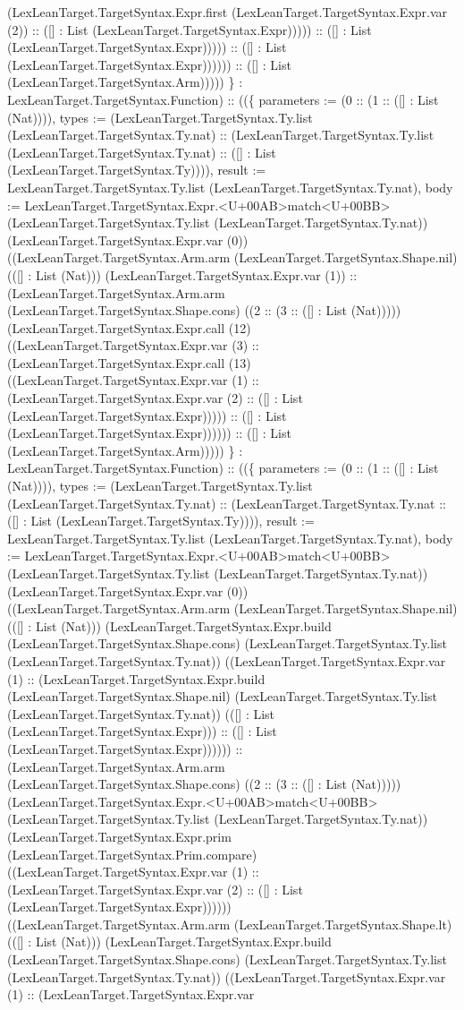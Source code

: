 \documentclass[11pt]{article}
\begin{document}
(LexLeanTarget.TargetSyntax.Expr.first (LexLeanTarget.TargetSyntax.Expr.var (2)) :: ([] : List (LexLeanTarget.TargetSyntax.Expr))))) :: ([] : List (LexLeanTarget.TargetSyntax.Expr))))) :: ([] : List (LexLeanTarget.TargetSyntax.Expr)))))) :: ([] : List (LexLeanTarget.TargetSyntax.Arm))))) \} : LexLeanTarget.TargetSyntax.Function) :: ((\{ parameters := (0 :: (1 :: ([] : List (Nat)))), types := (LexLeanTarget.TargetSyntax.Ty.list (LexLeanTarget.TargetSyntax.Ty.nat) :: (LexLeanTarget.TargetSyntax.Ty.list (LexLeanTarget.TargetSyntax.Ty.nat) :: ([] : List (LexLeanTarget.TargetSyntax.Ty)))), result := LexLeanTarget.TargetSyntax.Ty.list (LexLeanTarget.TargetSyntax.Ty.nat), body := LexLeanTarget.TargetSyntax.Expr.<U+00AB>match<U+00BB> (LexLeanTarget.TargetSyntax.Ty.list (LexLeanTarget.TargetSyntax.Ty.nat)) (LexLeanTarget.TargetSyntax.Expr.var (0)) ((LexLeanTarget.TargetSyntax.Arm.arm (LexLeanTarget.TargetSyntax.Shape.nil) (([] : List (Nat))) (LexLeanTarget.TargetSyntax.Expr.var (1)) :: (LexLeanTarget.TargetSyntax.Arm.arm (LexLeanTarget.TargetSyntax.Shape.cons) ((2 :: (3 :: ([] : List (Nat))))) (LexLeanTarget.TargetSyntax.Expr.call (12) ((LexLeanTarget.TargetSyntax.Expr.var (3) :: (LexLeanTarget.TargetSyntax.Expr.call (13) ((LexLeanTarget.TargetSyntax.Expr.var (1) :: (LexLeanTarget.TargetSyntax.Expr.var (2) :: ([] : List (LexLeanTarget.TargetSyntax.Expr))))) :: ([] : List (LexLeanTarget.TargetSyntax.Expr)))))) :: ([] : List (LexLeanTarget.TargetSyntax.Arm))))) \} : LexLeanTarget.TargetSyntax.Function) :: ((\{ parameters := (0 :: (1 :: ([] : List (Nat)))), types := (LexLeanTarget.TargetSyntax.Ty.list (LexLeanTarget.TargetSyntax.Ty.nat) :: (LexLeanTarget.TargetSyntax.Ty.nat :: ([] : List (LexLeanTarget.TargetSyntax.Ty)))), result := LexLeanTarget.TargetSyntax.Ty.list (LexLeanTarget.TargetSyntax.Ty.nat), body := LexLeanTarget.TargetSyntax.Expr.<U+00AB>match<U+00BB> (LexLeanTarget.TargetSyntax.Ty.list (LexLeanTarget.TargetSyntax.Ty.nat)) (LexLeanTarget.TargetSyntax.Expr.var (0)) ((LexLeanTarget.TargetSyntax.Arm.arm (LexLeanTarget.TargetSyntax.Shape.nil) (([] : List (Nat))) (LexLeanTarget.TargetSyntax.Expr.build (LexLeanTarget.TargetSyntax.Shape.cons) (LexLeanTarget.TargetSyntax.Ty.list (LexLeanTarget.TargetSyntax.Ty.nat)) ((LexLeanTarget.TargetSyntax.Expr.var (1) :: (LexLeanTarget.TargetSyntax.Expr.build (LexLeanTarget.TargetSyntax.Shape.nil) (LexLeanTarget.TargetSyntax.Ty.list (LexLeanTarget.TargetSyntax.Ty.nat)) (([] : List (LexLeanTarget.TargetSyntax.Expr))) :: ([] : List (LexLeanTarget.TargetSyntax.Expr)))))) :: (LexLeanTarget.TargetSyntax.Arm.arm (LexLeanTarget.TargetSyntax.Shape.cons) ((2 :: (3 :: ([] : List (Nat))))) (LexLeanTarget.TargetSyntax.Expr.<U+00AB>match<U+00BB> (LexLeanTarget.TargetSyntax.Ty.list (LexLeanTarget.TargetSyntax.Ty.nat)) (LexLeanTarget.TargetSyntax.Expr.prim (LexLeanTarget.TargetSyntax.Prim.compare) ((LexLeanTarget.TargetSyntax.Expr.var (1) :: (LexLeanTarget.TargetSyntax.Expr.var (2) :: ([] : List (LexLeanTarget.TargetSyntax.Expr)))))) ((LexLeanTarget.TargetSyntax.Arm.arm (LexLeanTarget.TargetSyntax.Shape.lt) (([] : List (Nat))) (LexLeanTarget.TargetSyntax.Expr.build (LexLeanTarget.TargetSyntax.Shape.cons) (LexLeanTarget.TargetSyntax.Ty.list (LexLeanTarget.TargetSyntax.Ty.nat)) ((LexLeanTarget.TargetSyntax.Expr.var (1) :: (LexLeanTarget.TargetSyntax.Expr.var 
\end{document}

